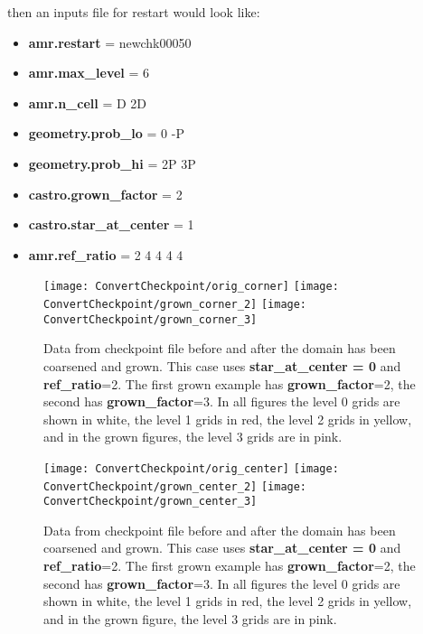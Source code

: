 then an inputs file for restart would look like:

\begin{itemize}

\item {\bf amr.restart} = newchk00050

\item {\bf amr.max\_level} = 6

\item {\bf amr.n\_cell}    = D 2D

\item {\bf geometry.prob\_lo} = 0   -P

\item {\bf geometry.prob\_hi} = 2P  3P

\item {\bf castro.grown\_factor} = 2

\item {\bf castro.star\_at\_center} = 1

\item {\bf amr.ref\_ratio}    = 2 4 4 4 4

\end{itemize}


\begin{figure}[h]
\centering
\texttt{[image: ConvertCheckpoint/orig\_corner]}
\texttt{[image: ConvertCheckpoint/grown\_corner\_2]}
\texttt{[image: ConvertCheckpoint/grown\_corner\_3]}
\caption{Data from checkpoint file before and after the domain has been coarsened and grown.  This case
uses {\bf star\_at\_center = 0}  and {\bf ref\_ratio}=2.  The first grown example has 
{\bf grown\_factor}=2,  the second has {\bf grown\_factor}=3.  In all figures the level 0 grids 
are shown in white, the level 1 grids in red, the level 2 grids in yellow, and in the grown figures, 
the level 3 grids are in pink.}
\end{figure}

\begin{figure}[h]
\centering
\texttt{[image: ConvertCheckpoint/orig\_center]}
\texttt{[image: ConvertCheckpoint/grown\_center\_2]}
\texttt{[image: ConvertCheckpoint/grown\_center\_3]}
\caption{Data from checkpoint file before and after the domain has been coarsened and grown.  This case
uses {\bf star\_at\_center = 0}  and {\bf ref\_ratio}=2.  The first grown example has 
{\bf grown\_factor}=2,  the second has {\bf grown\_factor}=3.  In all figures the level 0 grids 
are shown in white, the level 1 grids in red, the level 2 grids in yellow, and in the grown figure, 
the level 3 grids are in pink. }
\end{figure}

